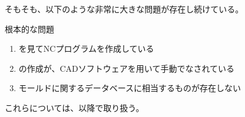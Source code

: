 \clearpage
そもそも、以下のような非常に大きな問題が存在し続けている。

\begin{Issues}{根本的な問題}
\begin{enumerate}[label=\sarrow]
\item[{\sarrow[red]}] \nameDrawing を見てNCプログラムを作成している
\item[{\sarrow[red]}] \nameDrawing の作成が、CADソフトウェアを用いて手動でなされている
\item[{\sarrow[red]}] モールドに関するデータベースに相当するものが存在しない
\end{enumerate}
\end{Issues}
これらについては、以降で取り扱う。

